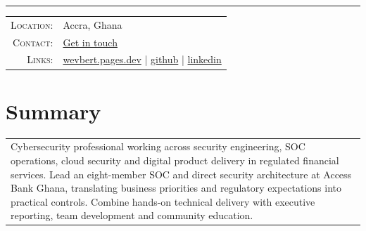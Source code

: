 \documentclass[a4paper,11pt]{article}
\begin{document}
\par{\bigskip\par}
\hrule\vspace{0.5em}
\begin{tabular}{rl}
\textsc{Location:} & Accra, Ghana\\[0pt]
\textsc{Contact:} & \faEnvelopeO{} \href{https://wevbert.pages.dev/contact}{Get in touch}\\[0pt]
\textsc{Links:} & \faHome{} \href{https://wevbert.pages.dev}{wevbert.pages.dev} | \faGithub{} \href{https://github.com/wevbert}{github} | \faLinkedin{} \href{https://linkedin.com/in/wevbert}{linkedin}\\[0pt]
\end{tabular}
\section{Summary}
\begin{tabular}{p{}}
Cybersecurity professional working across security engineering, SOC operations, cloud security and digital product delivery in regulated financial services. Lead an eight-member SOC and direct security architecture at Access Bank Ghana, translating business priorities and regulatory expectations into practical controls. Combine hands-on technical delivery with executive reporting, team development and community education.
\end{tabular}
\end{document}
